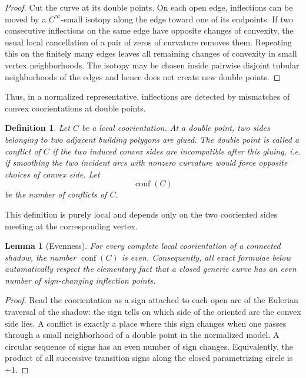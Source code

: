 \documentclass[11pt]{article}
\newtheorem{definition}[theorem]{Definition}
\newtheorem{lemma}[theorem]{Lemma}
\newcommand{\conf}{\operatorname{conf}}
\begin{document}
\begin{proof}
Cut the curve at its double points.  On each open edge, inflections can be moved by a $C^\infty$-small isotopy along the edge toward one of its endpoints.  If two consecutive inflections on the same edge have opposite changes of convexity, the usual local cancellation of a pair of zeros of curvature removes them.  Repeating this on the finitely many edges leaves all remaining changes of convexity in small vertex neighborhoods.  The isotopy may be chosen inside pairwise disjoint tubular neighborhoods of the edges and hence does not create new double points.
\end{proof}

Thus, in a normalized representative, inflections are detected by mismatches of convex coorientations at double points.

\begin{definition}\label{def:conflict}
Let $C$ be a local coorientation.  At a double point, two sides belonging to two adjacent building polygons are glued.  The double point is called a \emph{conflict} of $C$ if the two induced convex sides are incompatible after this gluing, i.e. if smoothing the two incident arcs with nonzero curvature would force opposite choices of convex side.  Let
\[
 \conf(C)
\]
be the number of conflicts of $C$.
\end{definition}

This definition is purely local and depends only on the two cooriented sides meeting at the corresponding vertex.

\begin{lemma}[Evenness]
\label{lem:evenconflicts}
For every complete local coorientation of a connected shadow, the number $\conf(C)$ is even.  Consequently, all exact formulae below automatically respect the elementary fact that a closed generic curve has an even number of sign-changing inflection points.
\end{lemma}

\begin{proof}
Read the coorientation as a sign attached to each open arc of the Eulerian traversal of the shadow: the sign tells on which side of the oriented arc the convex side lies.  A conflict is exactly a place where this sign changes when one passes through a small neighborhood of a double point in the normalized model.  A circular sequence of signs has an even number of sign changes.  Equivalently, the product of all successive transition signs along the closed parametrizing circle is $+1$.
\end{proof}
\end{document}
